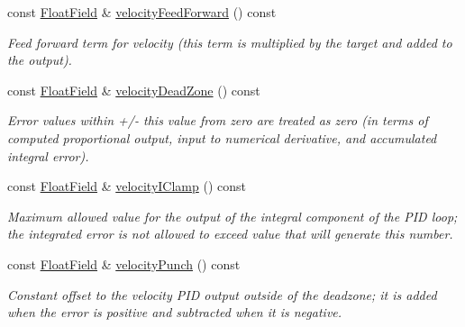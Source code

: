 \begin{DoxyCompactItemize}
const \hyperlink{classhebi_1_1Info_1_1FloatField}{Float\+Field} \& \hyperlink{classhebi_1_1Info_1_1Settings_1_1Actuator_1_1VelocityGains_a3ab00f019709084fd6e79012c2f8fc54}{velocity\+Feed\+Forward} () const
\begin{DoxyCompactList}\small\item\em Feed forward term for velocity (this term is multiplied by the target and added to the output). \end{DoxyCompactList}\item 
\mbox{\label{classhebi_1_1Info_1_1Settings_1_1Actuator_1_1VelocityGains_aadb1ec1ee69b354976d76b9bf232cfa2}} 
const \hyperlink{classhebi_1_1Info_1_1FloatField}{Float\+Field} \& \hyperlink{classhebi_1_1Info_1_1Settings_1_1Actuator_1_1VelocityGains_aadb1ec1ee69b354976d76b9bf232cfa2}{velocity\+Dead\+Zone} () const
\begin{DoxyCompactList}\small\item\em Error values within +/-\/ this value from zero are treated as zero (in terms of computed proportional output, input to numerical derivative, and accumulated integral error). \end{DoxyCompactList}\item 
\mbox{\label{classhebi_1_1Info_1_1Settings_1_1Actuator_1_1VelocityGains_a88a73fe56df5290454cc930b9b348e6d}} 
const \hyperlink{classhebi_1_1Info_1_1FloatField}{Float\+Field} \& \hyperlink{classhebi_1_1Info_1_1Settings_1_1Actuator_1_1VelocityGains_a88a73fe56df5290454cc930b9b348e6d}{velocity\+I\+Clamp} () const
\begin{DoxyCompactList}\small\item\em Maximum allowed value for the output of the integral component of the P\+ID loop; the integrated error is not allowed to exceed value that will generate this number. \end{DoxyCompactList}\item 
\mbox{\label{classhebi_1_1Info_1_1Settings_1_1Actuator_1_1VelocityGains_a49be042463becdc3d166ad8c7c3a7194}} 
const \hyperlink{classhebi_1_1Info_1_1FloatField}{Float\+Field} \& \hyperlink{classhebi_1_1Info_1_1Settings_1_1Actuator_1_1VelocityGains_a49be042463becdc3d166ad8c7c3a7194}{velocity\+Punch} () const
\begin{DoxyCompactList}\small\item\em Constant offset to the velocity P\+ID output outside of the deadzone; it is added when the error is positive and subtracted when it is negative. \end{DoxyCompactList}\item 

\end{DoxyCompactItemize}
